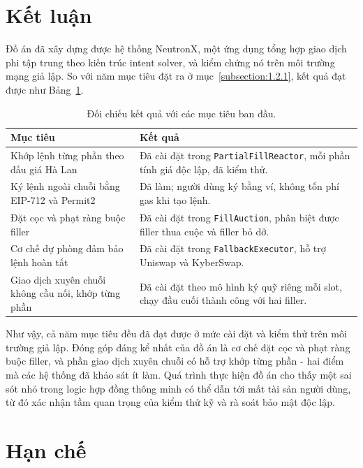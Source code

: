 \documentclass[../DoAn.tex]{subfiles}
\begin{document}
\section{Kết luận}
\label{sec:concl}

Đồ án đã xây dựng được hệ thống NeutronX, một ứng dụng tổng hợp giao dịch phi tập trung theo kiến trúc intent solver, và kiểm chứng nó trên môi trường mạng giả lập. So với năm mục tiêu đặt ra ở mục~\ref{subsection:1.2.1}, kết quả đạt được như Bảng~\ref{table:goals}.

\begin{table}[H]
    \centering
    \caption{Đối chiếu kết quả với các mục tiêu ban đầu.}
    \label{table:goals}
    \begin{tabular}{|p{6cm}|p{7cm}|}
        \hline
        \textbf{Mục tiêu} & \textbf{Kết quả} \\
        \hline
        Khớp lệnh từng phần theo đấu giá Hà Lan & Đã cài đặt trong \texttt{PartialFillReactor}, mỗi phần tính giá độc lập, đã kiểm thử. \\
        \hline
        Ký lệnh ngoài chuỗi bằng EIP-712 và Permit2 & Đã làm; người dùng ký bằng ví, không tốn phí gas khi tạo lệnh. \\
        \hline
        Đặt cọc và phạt ràng buộc filler & Đã cài đặt trong \texttt{FillAuction}, phân biệt được filler thua cuộc và filler bỏ dở. \\
        \hline
        Cơ chế dự phòng đảm bảo lệnh hoàn tất & Đã cài đặt trong \texttt{FallbackExecutor}, hỗ trợ Uniswap và KyberSwap. \\
        \hline
        Giao dịch xuyên chuỗi không cầu nối, khớp từng phần & Đã cài đặt theo mô hình ký quỹ riêng mỗi slot, chạy đầu cuối thành công với hai filler. \\
        \hline
    \end{tabular}
\end{table}

Như vậy, cả năm mục tiêu đều đã đạt được ở mức cài đặt và kiểm thử trên môi trường giả lập. Đóng góp đáng kể nhất của đồ án là cơ chế đặt cọc và phạt ràng buộc filler, và phần giao dịch xuyên chuỗi có hỗ trợ khớp từng phần - hai điểm mà các hệ thống đã khảo sát ít làm. Quá trình thực hiện đồ án cho thấy một sai sót nhỏ trong logic hợp đồng thông minh có thể dẫn tới mất tài sản người dùng, từ đó xác nhận tầm quan trọng của kiểm thử kỹ và rà soát bảo mật độc lập.

\section{Hạn chế}
\label{sec:limitations}
\end{document}

